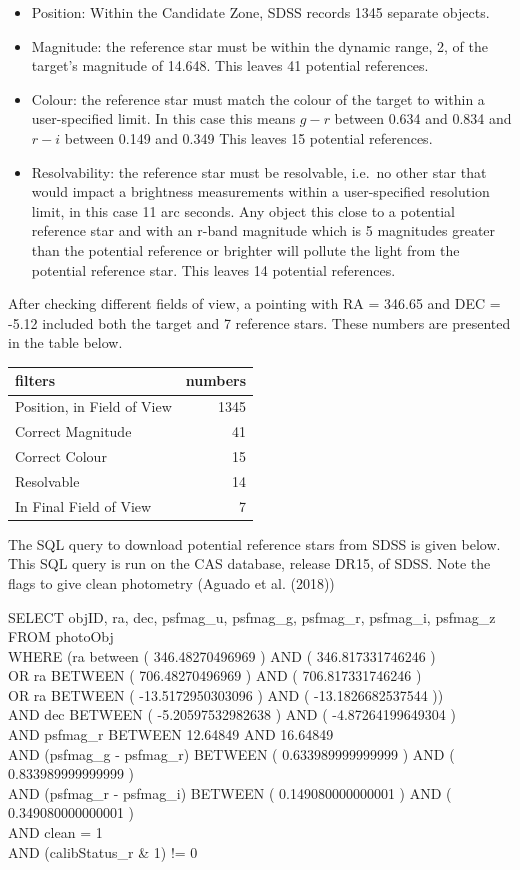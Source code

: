 \documentclass[]{elsarticle} %
\providecommand{\tightlist}{%
  \setlength{\itemsep}{0pt}\setlength{\parskip}{0pt}}
\begin{document}
\begin{itemize}
\tightlist
\item
  Position: Within the Candidate Zone, SDSS records 1345 separate
  objects.
\item
  Magnitude: the reference star must be within the dynamic range, 2, of
  the target's magnitude of 14.648. This leaves 41 potential references.
\item
  Colour: the reference star must match the colour of the target to
  within a user-specified limit. In this case this means \(g - r\)
  between 0.634 and 0.834 and \(r - i\) between 0.149 and 0.349 This
  leaves 15 potential references.
\item
  Resolvability: the reference star must be resolvable, i.e.~no other
  star that would impact a brightness measurements within a
  user-specified resolution limit, in this case 11 arc seconds. Any
  object this close to a potential reference star and with an r-band
  magnitude which is 5 magnitudes greater than the potential reference
  or brighter will pollute the light from the potential reference star.
  This leaves 14 potential references.
\end{itemize}

After checking different fields of view, a pointing with RA = 346.65 and
DEC = -5.12 included both the target and 7 reference stars. These
numbers are presented in the table below.

\begin{longtable}[]{@{}lr@{}}
\toprule
filters & numbers\tabularnewline
\midrule
\endhead
Position, in Field of View & 1345\tabularnewline
Correct Magnitude & 41\tabularnewline
Correct Colour & 15\tabularnewline
Resolvable & 14\tabularnewline
In Final Field of View & 7\tabularnewline
\bottomrule
\end{longtable}

\newpage

The SQL query to download potential reference stars from SDSS is given
below. This SQL query is run on the CAS database, release DR15, of SDSS.
Note the flags to give clean photometry (Aguado et al. (2018))

SELECT objID, ra, dec, psfmag\_u, psfmag\_g, psfmag\_r, psfmag\_i,
psfmag\_z\\
FROM photoObj\\
WHERE (ra between ( 346.48270496969 ) AND ( 346.817331746246 )\\
OR ra BETWEEN ( 706.48270496969 ) AND ( 706.817331746246 )\\
OR ra BETWEEN ( -13.5172950303096 ) AND ( -13.1826682537544 ))\\
AND dec BETWEEN ( -5.20597532982638 ) AND ( -4.87264199649304 )\\
AND psfmag\_r BETWEEN 12.64849 AND 16.64849\\
AND (psfmag\_g - psfmag\_r) BETWEEN ( 0.633989999999999 ) AND (
0.833989999999999 )\\
AND (psfmag\_r - psfmag\_i) BETWEEN ( 0.149080000000001 ) AND (
0.349080000000001 )\\
AND clean = 1\\
AND (calibStatus\_r \& 1) != 0
\end{document}
